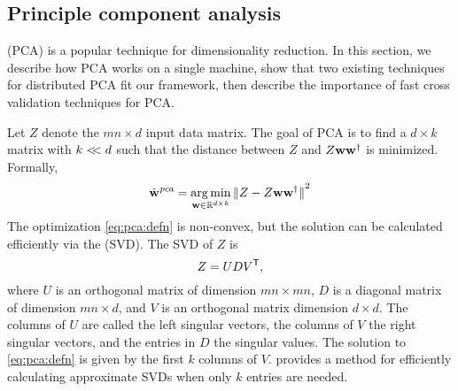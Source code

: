 \documentclass[thesis.tex]{subfiles}
\newcommand{\wpca}{\hat\w^\textit{pca}}
\begin{document}

\subsection{Principle component analysis}
\label{sec:merge:pca}

 (PCA) is a popular technique for dimensionality reduction.
In this section,
we describe how PCA works on a single machine,
show that two existing techniques for distributed PCA fit our framework,
then describe the importance of fast cross validation techniques for PCA.

Let $Z$ denote the $mn\times d$ input data matrix.
The goal of PCA is to find a $d\times k$ matrix with $k <\!\!< d$ such that the distance between $Z$ and $Z\mathbf w{\mathbf w}^{\mathsf{\dagger}}$ is minimized.
Formally, 
\begin{equation}
    \label{eq:pca:defn}
    \wpca = \argmin_{\w\in\R^{d\times k}} \ltwo{Z - Z\w\pinv\w}^2
\end{equation}
The optimization \eqref{eq:pca:defn} is non-convex, 
but the solution can be calculated efficiently via the  (SVD). 
The SVD of $Z$ is
\begin{equation}
    Z = UD{V}^{\mathsf{T}}
    ,
\end{equation}
where $U$ is an orthogonal matrix of dimension $mn\times mn$, 
$D$ is a diagonal matrix of dimension $mn\times d$, 
and $V$ is an orthogonal matrix dimension $d\times d$.
The columns of $U$ are called the left singular vectors, 
the columns of $V$ the right singular vectors,
and the entries in $D$ the singular values.
The solution to \eqref{eq:pca:defn} is given by the first $k$ columns of $V$.
\citet{halko2011finding} provides a method for efficiently calculating approximate SVDs when only $k$ entries are needed.
\end{document}
